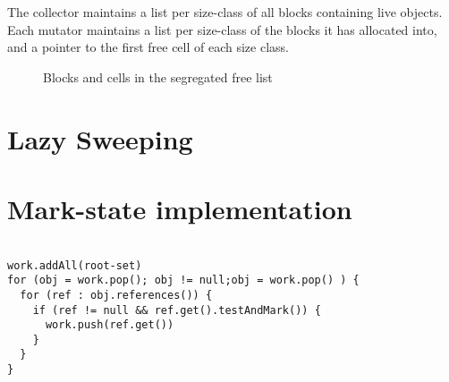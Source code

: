 The collector maintains a list per size-class of all blocks containing live
objects.  Each mutator maintains a list per size-class of the blocks it has
allocated into, and a pointer to the first free cell of each size class.

\begin{figure}
\begin{center}
 
\end{center}
\caption{Blocks and cells in the segregated free list}
\end{figure}

\section{Lazy Sweeping}
\label{sec:ms:lazy}



\section{Mark-state implementation}
\label{sec:ms:state}




\begin{lstlisting}[name=Mark Phase, 
                   caption=\lstname: pseudo-code for mark-sweep,
                   label=fig:ms:pseudo]
                   
work.addAll(root-set)
for (obj = work.pop(); obj != null;obj = work.pop() ) {
  for (ref : obj.references()) {
    if (ref != null && ref.get().testAndMark()) {
      work.push(ref.get())
    }
  }
}
\end{lstlisting}

